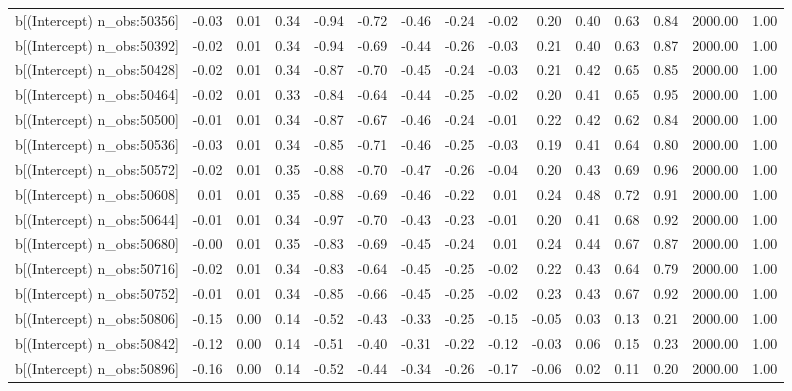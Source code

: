 \begin{table}[ht]
\begin{tabular}{rrrrrrrrrrrrrrr}
  b[(Intercept) n\_obs:50356] & -0.03 & 0.01 & 0.34 & -0.94 & -0.72 & -0.46 & -0.24 & -0.02 & 0.20 & 0.40 & 0.63 & 0.84 & 2000.00 & 1.00 \\ 
  b[(Intercept) n\_obs:50392] & -0.02 & 0.01 & 0.34 & -0.94 & -0.69 & -0.44 & -0.26 & -0.03 & 0.21 & 0.40 & 0.63 & 0.87 & 2000.00 & 1.00 \\ 
  b[(Intercept) n\_obs:50428] & -0.02 & 0.01 & 0.34 & -0.87 & -0.70 & -0.45 & -0.24 & -0.03 & 0.21 & 0.42 & 0.65 & 0.85 & 2000.00 & 1.00 \\ 
  b[(Intercept) n\_obs:50464] & -0.02 & 0.01 & 0.33 & -0.84 & -0.64 & -0.44 & -0.25 & -0.02 & 0.20 & 0.41 & 0.65 & 0.95 & 2000.00 & 1.00 \\ 
  b[(Intercept) n\_obs:50500] & -0.01 & 0.01 & 0.34 & -0.87 & -0.67 & -0.46 & -0.24 & -0.01 & 0.22 & 0.42 & 0.62 & 0.84 & 2000.00 & 1.00 \\ 
  b[(Intercept) n\_obs:50536] & -0.03 & 0.01 & 0.34 & -0.85 & -0.71 & -0.46 & -0.25 & -0.03 & 0.19 & 0.41 & 0.64 & 0.80 & 2000.00 & 1.00 \\ 
  b[(Intercept) n\_obs:50572] & -0.02 & 0.01 & 0.35 & -0.88 & -0.70 & -0.47 & -0.26 & -0.04 & 0.20 & 0.43 & 0.69 & 0.96 & 2000.00 & 1.00 \\ 
  b[(Intercept) n\_obs:50608] & 0.01 & 0.01 & 0.35 & -0.88 & -0.69 & -0.46 & -0.22 & 0.01 & 0.24 & 0.48 & 0.72 & 0.91 & 2000.00 & 1.00 \\ 
  b[(Intercept) n\_obs:50644] & -0.01 & 0.01 & 0.34 & -0.97 & -0.70 & -0.43 & -0.23 & -0.01 & 0.20 & 0.41 & 0.68 & 0.92 & 2000.00 & 1.00 \\ 
  b[(Intercept) n\_obs:50680] & -0.00 & 0.01 & 0.35 & -0.83 & -0.69 & -0.45 & -0.24 & 0.01 & 0.24 & 0.44 & 0.67 & 0.87 & 2000.00 & 1.00 \\ 
  b[(Intercept) n\_obs:50716] & -0.02 & 0.01 & 0.34 & -0.83 & -0.64 & -0.45 & -0.25 & -0.02 & 0.22 & 0.43 & 0.64 & 0.79 & 2000.00 & 1.00 \\ 
  b[(Intercept) n\_obs:50752] & -0.01 & 0.01 & 0.34 & -0.85 & -0.66 & -0.45 & -0.25 & -0.02 & 0.23 & 0.43 & 0.67 & 0.92 & 2000.00 & 1.00 \\ 
  b[(Intercept) n\_obs:50806] & -0.15 & 0.00 & 0.14 & -0.52 & -0.43 & -0.33 & -0.25 & -0.15 & -0.05 & 0.03 & 0.13 & 0.21 & 2000.00 & 1.00 \\ 
  b[(Intercept) n\_obs:50842] & -0.12 & 0.00 & 0.14 & -0.51 & -0.40 & -0.31 & -0.22 & -0.12 & -0.03 & 0.06 & 0.15 & 0.23 & 2000.00 & 1.00 \\ 
  b[(Intercept) n\_obs:50896] & -0.16 & 0.00 & 0.14 & -0.52 & -0.44 & -0.34 & -0.26 & -0.17 & -0.06 & 0.02 & 0.11 & 0.20 & 2000.00 & 1.00 \\ 

\end{tabular}
\end{table}
